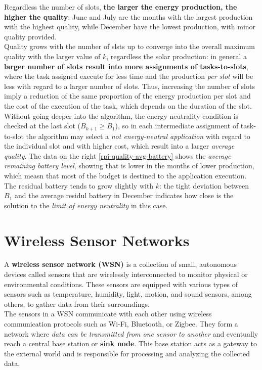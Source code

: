 \documentclass[10pt,a4paper]{report}
\theoremstyle{definition}
\begin{document}
Regardless the number of slots, \textbf{the larger the energy production, the higher the quality}: June and July are the months with the largest production with the highest quality, while December have the lowest production, with minor quality provided. \\
Quality grows with the number of slsts up to converge into the overall maximum quality with the larger value of $k$, regardless the solar production: in general a \textbf{larger number of slots result into more assignments of tasks-to-slots}, where the task assigned execute for less time and the production \textit{per slot} will be less with regard to a larger number of slots.
Thus, increasing the number of slots imply a reduction of the same proportion of the energy production per slot and the cost of the execution of the task, which depends on the duration of the slot. \\
Without going deeper into the algorithm, the energy neutrality condition is checked at the last slot ($B_{k+1} \geq B_{1}$), so in each intermediate assignment of task-to-slot the algorithm may select a \textit{not energy-neutral application} with regard to the individual slot and with higher cost, which result into a larger \textit{average quality}. 
The data on the right \ref{rpi-quality-avg-battery} shows the \textit{average remaining battery level}, showing that is lower in the months of lower production, which measn that most of the budget is destined to the application execution. The residual battery tends to grow slightly with $k$: the tight deviation between $B_{1}$ and the average residul battery in December indicates how close is the solution to the \textit{limit of energy neutrality} in this case.


\chapter{Wireless Sensor Networks}\label{chap:wireless-sensor-network}

A \textbf{wireless sensor network (WSN)} is a collection of small, autonomous devices called sensors that are wirelessly interconnected to monitor physical or environmental conditions. These sensors are equipped with various types of sensors such as temperature, humidity, light, motion, and sound sensors, among others, to gather data from their surroundings.\\
The sensors in a WSN communicate with each other using wireless communication protocols such as Wi-Fi, Bluetooth, or Zigbee. They form a network where \textit{data can be transmitted from one sensor to another} and eventually reach a central base station or \textbf{sink node}. This base station acts as a gateway to the external world and is responsible for processing and analyzing the collected data.
\end{document}

